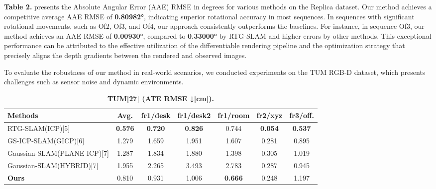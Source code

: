 \documentclass[twocolumn]{article} %
\begin{document}
\textbf{Table 2.} presents the Absolute Angular Error (AAE) RMSE in
degrees for various methods on the Replica dataset. Our method achieves
a competitive average AAE RMSE of \textbf{0.80982°}, indicating superior
rotational accuracy in most sequences. In sequences with significant
rotational movements, such as Of2, Of3, and Of4, our approach
consistently outperforms the baselines. For instance, in sequence Of3,
our method achieves an AAE RMSE of \textbf{0.00930°}, compared to
\textbf{0.33000°} by RTG-SLAM and higher errors by other methods. This
exceptional performance can be attributed to the effective utilization
of the differentiable rendering pipeline and the optimization strategy
that precisely aligns the depth gradients between the rendered and
observed images.

To evaluate the robustness of our method in real-world scenarios, we
conducted experiments on the TUM RGB-D dataset, which presents
challenges such as sensor noise and dynamic environments.

\begin{table}[htbp]
\renewcommand{\thetable}{\textbf{\arabic{table}}}
\renewcommand{\tablename}{\textbf{Table}}
\centering
\caption{\textbf{TUM[27] (ATE RMSE ↓[cm]).}}
\label{table:_textbf_tum_27_ate_r}
\begin{adjustbox}{max width=\columnwidth,max height=!,center}
\begin{tabular}{lcccccc}
\toprule
\textbf{Methods} & \textbf{Avg.} & \textbf{fr1/desk} & \textbf{fr1/desk2} & \textbf{fr1/room} & \textbf{fr2/xyz} & \textbf{fr3/off.}\\
\midrule
RTG-SLAM(ICP)[5] & \cellcolor{green!30}\textbf{0.576} & \cellcolor{green!30}\textbf{0.720} & \cellcolor{green!30}\textbf{0.826} & \cellcolor{yellow!30}0.744 & \cellcolor{green!30}\textbf{0.054} & \cellcolor{green!30}\textbf{0.537}\\
GS-ICP-SLAM(GICP)[6] & \cellcolor{lime!50}1.279 & \cellcolor{lime!50}1.659 & 1.951 & 1.607 & \cellcolor{lime!50}0.281 & \cellcolor{yellow!30}0.895\\
Gaussian-SLAM(PLANE ICP)[7] & 1.287 & 1.834 & \cellcolor{lime!50}1.880 & \cellcolor{lime!50}1.398 & 0.305 & 1.019\\
Gaussian-SLAM(HYBRID)[7] & 1.955 & 2.265 & 3.493 & 2.783 & 0.287 & \cellcolor{lime!50}0.945\\
\midrule
\textbf{Ours} & \cellcolor{yellow!30}0.810 & \cellcolor{yellow!30}0.931 & \cellcolor{yellow!30}1.006 & \cellcolor{green!30}\textbf{0.666} & \cellcolor{yellow!30}0.248 & 1.197\\
\bottomrule
\end{tabular}
\end{adjustbox}
\end{table}
\end{document}
